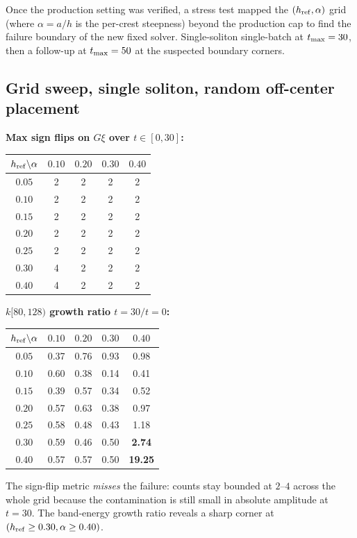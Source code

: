 \documentclass[11pt]{article}
\begin{document}
Once the production setting was verified, a stress test mapped the
$(h_{\rm ref}, \alpha)$ grid (where $\alpha = a/h$ is the per-crest steepness)
beyond the production cap to find the failure boundary of the new fixed solver.
Single-soliton single-batch at $t_{\rm max} = 30$, then a follow-up at
$t_{\rm max} = 50$ at the suspected boundary corners.

\subsection{Grid sweep, single soliton, random off-center placement}

\begin{center}
\small
\textbf{Max sign flips on $G\xi$ over $t \in [0, 30]$:}\\[2pt]
\begin{tabular}{c|cccc}
\toprule
$h_{\rm ref} \backslash \alpha$ & $0.10$ & $0.20$ & $0.30$ & $0.40$ \\
\midrule
$0.05$ & 2 & 2 & 2 & 2 \\
$0.10$ & 2 & 2 & 2 & 2 \\
$0.15$ & 2 & 2 & 2 & 2 \\
$0.20$ & 2 & 2 & 2 & 2 \\
$0.25$ & 2 & 2 & 2 & 2 \\
$0.30$ & 4 & 2 & 2 & 2 \\
$0.40$ & 4 & 2 & 2 & 2 \\
\bottomrule
\end{tabular}
\quad
\textbf{$k[80,128)$ growth ratio $t=30 / t=0$:}\\[2pt]
\begin{tabular}{c|cccc}
\toprule
$h_{\rm ref} \backslash \alpha$ & $0.10$ & $0.20$ & $0.30$ & $0.40$ \\
\midrule
$0.05$ & 0.37 & 0.76 & 0.93 & 0.98 \\
$0.10$ & 0.60 & 0.38 & 0.14 & 0.41 \\
$0.15$ & 0.39 & 0.57 & 0.34 & 0.52 \\
$0.20$ & 0.57 & 0.63 & 0.38 & 0.97 \\
$0.25$ & 0.58 & 0.48 & 0.43 & 1.18 \\
$0.30$ & 0.59 & 0.46 & 0.50 & \textbf{2.74} \\
$0.40$ & 0.57 & 0.57 & 0.50 & \textbf{19.25} \\
\bottomrule
\end{tabular}
\end{center}

The sign-flip metric \emph{misses} the failure: counts stay bounded at $2$--$4$
across the whole grid because the contamination is still small in absolute
amplitude at $t = 30$. The band-energy growth ratio reveals a sharp corner at
$(h_{\rm ref} \geq 0.30, \alpha \geq 0.40)$.
\end{document}
